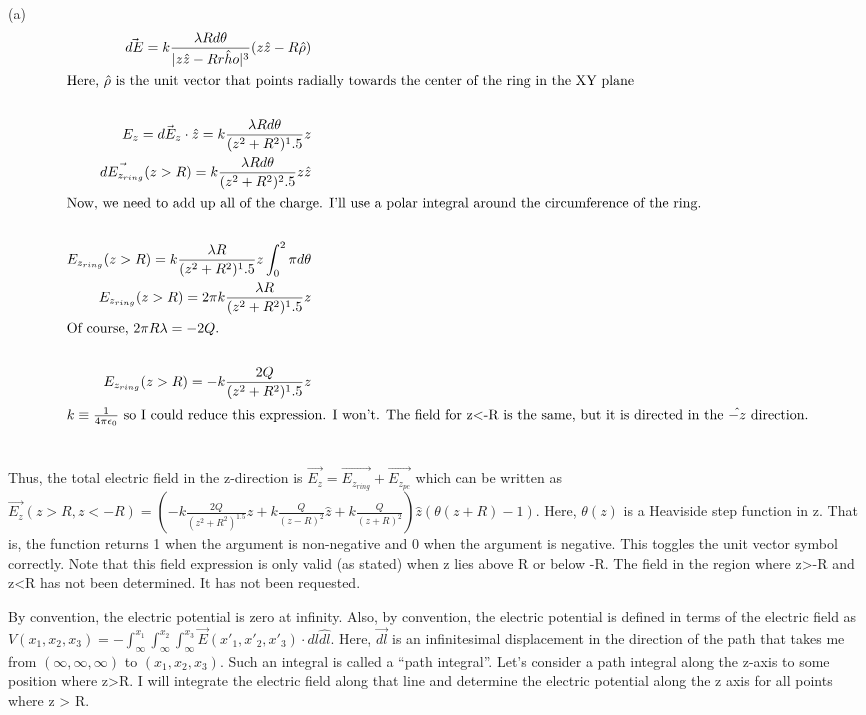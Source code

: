 \begin{homeworkProblem}
\begin{homeworkSection}{(a)}
\begin{align}
\vec{dE} = k \frac{\lambda R d\theta}{|z\hat{z}-R\hat{rho}|^3}(z\hat{z} - R\hat{\rho}) \nonumber \\
\intertext{Here, $\hat{\rho}$ is the unit vector that points radially towards the center of the ring in the XY plane} \nonumber \\
E_z = \vec{dE_z} \cdot \hat{z} = k \frac{\lambda R d\theta}{(z^2+R^2)^1.5}z \nonumber \\
\vec{dE_{z_{ring}}}(z>R) = k \frac{\lambda R d\theta}{(z^2+R^2)^2.5}z \hat{z} \nonumber \\
\intertext{Now, we need to add up all of the charge. I'll use a polar integral around the circumference of the ring.} \nonumber \\
E_{z_{ring}}(z>R) = k \frac{\lambda R}{(z^2+R^2)^1.5}z \int_0^2\pi d\theta \nonumber \\
E_{z_{ring}}(z>R) = 2\pi k \frac{\lambda R}{(z^2+R^2)^1.5}z \nonumber \\
\intertext{Of course, $2\pi R \lambda  = -2Q$.} \nonumber \\
E_{z_{ring}}(z>R) = -k \frac{2Q}{(z^2+R^2)^1.5}z \nonumber \\
\intertext{$k \equiv \frac{1}{4\pi \epsilon_0}$ so I could reduce this expression. I won't. The field for z<-R is the same, but it is directed in the $\hat{-z}$ direction.} \nonumber
\end{align}

Thus, the total electric field in the z-direction is $\vec{E_z} = \vec{E_{z_{ring}}} + \vec{E_{z_{pc}}}$ which can be written as $\vec{E_z}(z>R,z<-R) = (-k \frac{2Q}{(z^2+R^2)^1.5}z + k \frac{Q}{(z-R)^2}\hat{z} + k \frac{Q}{(z+R)^2} ) \hat{z} (\theta(z+R)-1)$. Here, $\theta (z)$ is a Heaviside step function in z. That is, the function returns 1 when the argument is non-negative and 0 when the argument is negative. This toggles the unit vector symbol correctly. Note that this field expression is only valid (as stated) when z lies above R or below -R. The field in the region where z>-R and z<R has not been determined. It has not been requested.

By convention, the electric potential is zero at infinity. Also, by convention, the electric potential is defined in terms of the electric field as $V(x_1,x_2,x_3) = -\int_\infty^{x_1} \int_\infty^{x_2} \int_\infty^{x_3} \vec{E}(x'_1,x'_2,x'_3) \cdot dl \hat{dl}$. Here, $\vec{dl}$ is an infinitesimal displacement in the direction of the path that takes me from $(\infty,\infty,\infty)$ to $(x_1,x_2,x_3)$. Such an integral is called a ``path integral''. Let's consider a path integral along the z-axis to some position where z>R. I will integrate the electric field along that line and determine the electric potential along the z axis for all points where z > R. 


\end{homeworkSection}
\end{homeworkProblem}
